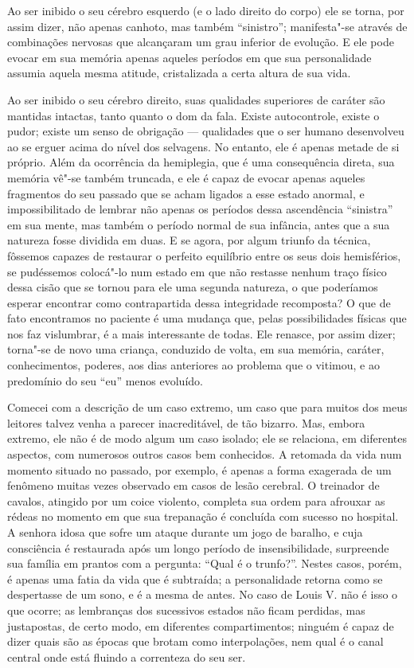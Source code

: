 Ao ser inibido o seu cérebro esquerdo (e o lado  direito do corpo) ele
se torna, por assim dizer, não apenas canhoto, mas também “sinistro”;
manifesta"-se através de combinações nervosas que alcançaram um grau
inferior de evolução.  E ele pode evocar em sua memória apenas aqueles
períodos em que sua personalidade assumia aquela mesma atitude,
cristalizada a certa altura de sua vida. 

Ao ser inibido o seu cérebro direito, suas qualidades superiores de
caráter são mantidas intactas, tanto quanto o dom da fala. Existe
autocontrole, existe o pudor; existe um senso de obrigação ---
qualidades que o ser humano desenvolveu ao se erguer acima do nível dos
selvagens.  No entanto, ele é apenas metade de si próprio.  Além da
ocorrência da hemiplegia, que é uma consequência direta, sua memória
vê"-se também truncada, e ele é capaz de evocar apenas aqueles
fragmentos do seu passado que se acham ligados a esse estado anormal, e
impossibilitado de lembrar não apenas os períodos dessa ascendência
“sinistra” em sua mente, mas também o período normal de sua infância,
antes que a sua natureza fosse dividida em duas.  E se agora, por algum
triunfo da técnica, fôssemos capazes de restaurar o perfeito equilíbrio
entre os seus dois hemisférios, se pudéssemos colocá"-lo num estado em
que não restasse nenhum traço físico dessa cisão que se tornou para ele
uma segunda natureza, o que poderíamos esperar encontrar como
contrapartida dessa integridade recomposta?  O que de fato encontramos
no paciente é uma mudança que, pelas possibilidades físicas que nos faz
vislumbrar, é a mais interessante de todas.  Ele renasce, por assim
dizer; torna"-se de novo uma criança, conduzido de volta, em sua
memória, caráter, conhecimentos, poderes, aos dias anteriores ao
problema que o vitimou, e ao predomínio do seu “eu” menos evoluído.

Comecei com a descrição de um caso extremo, um caso que para muitos dos
meus leitores talvez venha a parecer inacreditável, de tão bizarro. 
Mas, embora extremo, ele não é de modo algum um caso isolado; ele se
relaciona, em diferentes aspectos, com numerosos outros casos bem
conhecidos.  A retomada da vida num momento situado no passado, por
exemplo, é apenas a forma exagerada de um fenômeno muitas vezes
observado em casos de lesão cerebral.  O treinador de cavalos, atingido
por um coice violento, completa sua ordem para afrouxar as rédeas no
momento em que sua trepanação é concluída com sucesso no hospital.  A
senhora idosa que sofre um ataque durante um jogo de baralho, e cuja
consciência é restaurada após um longo período de insensibilidade,
surpreende sua família em prantos com a pergunta: “Qual é o trunfo?”. 
Nestes casos, porém, é apenas uma fatia da vida que é subtraída; a
personalidade retorna como se despertasse de um sono, e é a mesma de
antes. No caso de Louis V. não é isso o que ocorre; as lembranças dos
sucessivos estados não ficam perdidas, mas justapostas, de certo modo,
em diferentes compartimentos; ninguém é capaz de dizer quais são as
épocas que brotam como interpolações, nem qual é o canal central onde
está fluindo a correnteza do seu ser.

